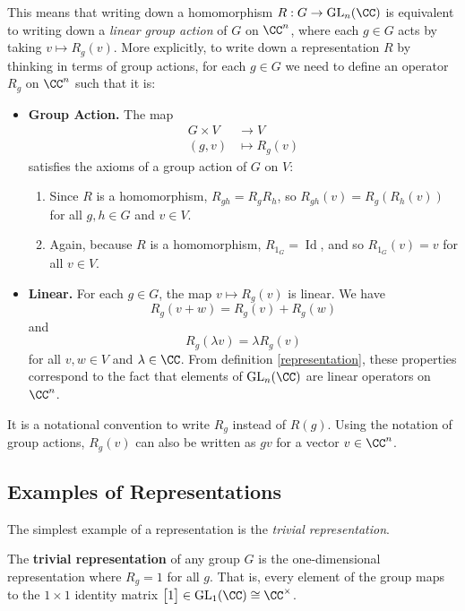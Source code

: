 This means that writing down a homomorphism $R : G \to \operatorname{GL}_n(\CC)$ is equivalent to writing down a \emph{linear group action} of $G$ on $\CC^n$, where each $g \in G$ acts by taking $v \mapsto R_g(v)$. More explicitly, to write down a representation $R$ by thinking in terms of group actions, for each $g \in G$ we need to define an operator $R_g$ on $\CC^n$ such that it is:
\begin{itemize}
    \item \textbf{Group Action.} The map \begin{align*} G \times V &\to V \\ (g, v) &\mapsto R_g(v)\end{align*} satisfies the axioms of a group action of $G$ on $V$:
    \begin{enumerate}
        \item Since $R$ is a homomorphism, $R_{gh} = R_gR_h$, so $R_{gh}(v) = R_g(R_h(v))$ for all $g, h \in G$ and $v \in V$.
        \item Again, because $R$ is a homomorphism, $R_{1_G} = \operatorname{Id}$, and so $R_{1_G}(v) = v$ for all $v \in V$.
    \end{enumerate} 
    \item \textbf{Linear.} For each $g \in G$, the map $v \mapsto R_g(v)$ is linear. We have \[R_g(v + w) = R_g(v) + R_g(w)\] and \[R_g(\lambda v) = \lambda R_g(v)\] for all $v, w \in V$ and $\lambda \in \CC$. From definition \ref{representation}, these properties correspond to the fact that elements of $\operatorname{GL}_n(\CC)$ are linear operators on $\CC^n$.
\end{itemize}

\begin{note}
It is a notational convention to write $R_g$ instead of $R(g)$. Using the notation of group actions, $R_g(v)$ can also be written as $gv$ for a vector $v \in \CC^n$. 
\end{note}

\subsection{Examples of Representations}

The simplest example of a representation is the \emph{trivial representation}.

\begin{example}
The \textbf{trivial representation} of any group $G$ is the one-dimensional representation where $R_g = 1$ for all $g$. That is, every element of the group maps to the $1 \times 1$ identity matrix $\begin{bmatrix} 1 \end{bmatrix} \in \operatorname{GL}_1(\CC) \cong \CC^\times$.
\end{example}

